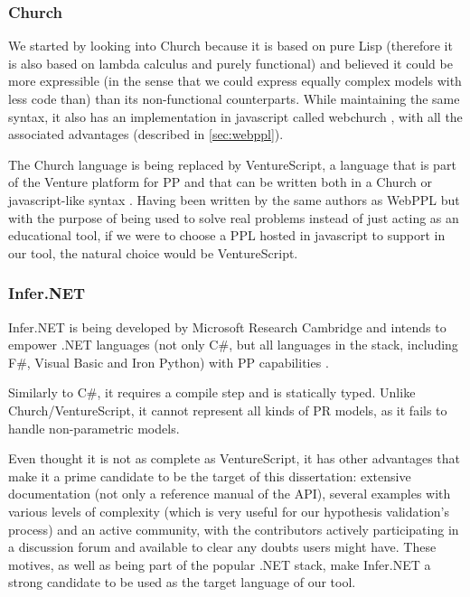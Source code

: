 \begin{itemsize}
\subsubsection{Church}
\label{sec:church}

We started by looking into Church because it is based on pure Lisp (therefore
it is also based on lambda calculus and purely functional) \cite{Goodman2008} and believed it could
be more expressible (in the sense that we could express equally complex models
with less code than) than its non-functional counterparts. While maintaining the same syntax,
it also has an implementation in javascript called webchurch \cite{church},
with all the associated advantages (described in \ref{sec:webppl}).

The Church language is being replaced by VentureScript, a language that is part
of the Venture platform for PP and that can be written both in a Church or javascript-like
syntax \cite{probcomp}. Having been written by the same authors as WebPPL but
with the purpose of being used to solve real problems instead of just acting as
an educational tool, if we were to choose a PPL hosted in javascript to support
in our tool, the natural choice would be VentureScript.

\subsubsection{Infer.NET}

Infer.NET is being developed by Microsoft Research Cambridge and intends to
empower .NET languages (not only C#, but all languages in the stack, including
F#, Visual Basic and Iron Python) with PP capabilities \cite{InferNET14}.

Similarly to C#, it requires a compile step and is statically typed. Unlike
Church/VentureScript, it cannot represent all kinds of PR models, as it fails to handle
non-parametric models.

Even thought it is not as complete as VentureScript, it has other advantages
that make it a prime candidate to be the target of this dissertation: extensive
documentation (not only a reference manual of the API), several examples with
various levels of complexity (which is very useful for our hypothesis validation's
process) and an active community, with the contributors
actively participating in a discussion forum and available to clear any doubts
users might have. These motives, as well as being part of the popular .NET
stack, make Infer.NET a strong candidate to be used as the target language of our tool.


\end{itemsize}
